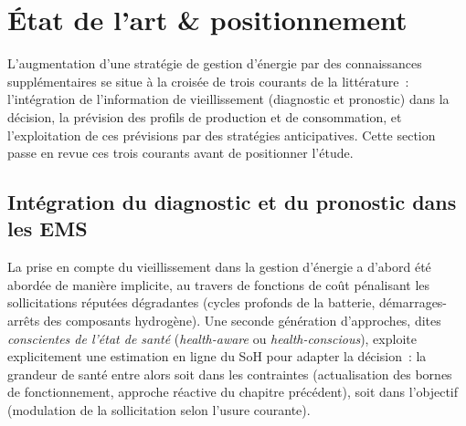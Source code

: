 %

\section{État de l'art \& positionnement}
\label{sec:eda_ch4}

L'augmentation d'une stratégie de gestion d'énergie par des connaissances supplémentaires se situe à la croisée de trois courants de la littérature~: l'intégration de l'information de vieillissement (diagnostic et pronostic) dans la décision, la prévision des profils de production et de consommation, et l'exploitation de ces prévisions par des stratégies anticipatives. Cette section passe en revue ces trois courants avant de positionner l'étude.

\subsection{Intégration du diagnostic et du pronostic dans les EMS}
\label{subsec:health_aware_sota}

La prise en compte du vieillissement dans la gestion d'énergie a d'abord été abordée de manière implicite, au travers de fonctions de coût pénalisant les sollicitations réputées dégradantes (cycles profonds de la batterie, démarrages-arrêts des composants hydrogène). Une seconde génération d'approches, dites \emph{conscientes de l'état de santé} (\textit{health-aware} ou \textit{health-conscious}), exploite explicitement une estimation en ligne du SoH pour adapter la décision~: la grandeur de santé entre alors soit dans les contraintes (actualisation des bornes de fonctionnement, approche réactive du chapitre précédent), soit dans l'objectif (modulation de la sollicitation selon l'usure courante).

